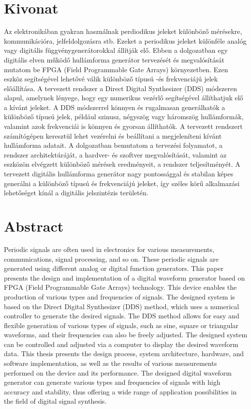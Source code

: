 \documentclass[a4paper,12pt]{article}
\begin{document}
	\section*{Kivonat}
	Az elektronikában gyakran használnak perdiodikus jeleket különböző mérésekre, kommunikációra, jelfeldolgozásra stb. Ezeket a periodikus jeleket különféle analóg vagy digitális függvénygenerátorokkal állítják elő. Ebben a dolgozatban egy digitális elven működő hullámforma generátor tervezését és megvalósítását mutatom be FPGA (Field Programmable Gate Arrays) környezetben. Ezen eszköz segítségével lehetővé válik különböző típusú -és frekvenciájú jelek előállítása. A tervezett rendszer a Direct Digital Synthesizer (DDS) módszeren alapul, amelynek lényege, hogy egy numerikus vezérlő segítségével állíthatjuk elő a kívánt jeleket. A DDS módszerrel könnyen és rugalmasan generálhatók a különböző típusú jelek, például szinusz, négyszög vagy háromszög hullámformák, valamint azok frekvenciái is könnyen és gyorsan állíthatók. A tervezett rendszert számítógépen keresztül lehet vezérelni és beállítani a megjeleníteni kívánt hullámforma adatait. A dolgozatban bemutatom a tervezési folyamatot, a rendszer architektúráját, a hardver- és szoftver megvalósítását, valamint az eszközön elvégzett különböző mérések eredményeit, a rendszer teljesítményét. A tervezett digitális hullámforma generátor nagy pontossággal és stabilan képes generálni a különböző típusú és frekvenciájú jeleket, így széles körű alkalmazási lehetőséget kínál a digitális jelszintézis területén.

	\clearpage
	\section*{Abstract} 
	Periodic signals are often used in electronics for various measurements, communications, signal processing, and so on. These periodic signals are generated using different analog or digital function generators. This paper presents the design and implementation of a digital waveform generator based on FPGA (Field Programmable Gate Arrays) technology. This device enables the production of various types and frequencies of signals. The designed system is based on the Direct Digital Synthesizer (DDS) method, which uses a numerical controller to generate the desired signals. The DDS method allows for easy and flexible generation of various types of signals, such as sine, square or triangular waveforms, and their frequencies can also be freely adjusted. The designed system can be controlled and adjusted via a computer to display the desired waveform data. This thesis presents the design process, system architecture, hardware, and software implementation, as well as the results of various measurements performed on the device and its performance. The designed digital waveform generator can generate various types and frequencies of signals with high accuracy and stability, thus offering a wide range of application possibilities in the field of digital signal synthesis.
	\newpage
\end{document}
